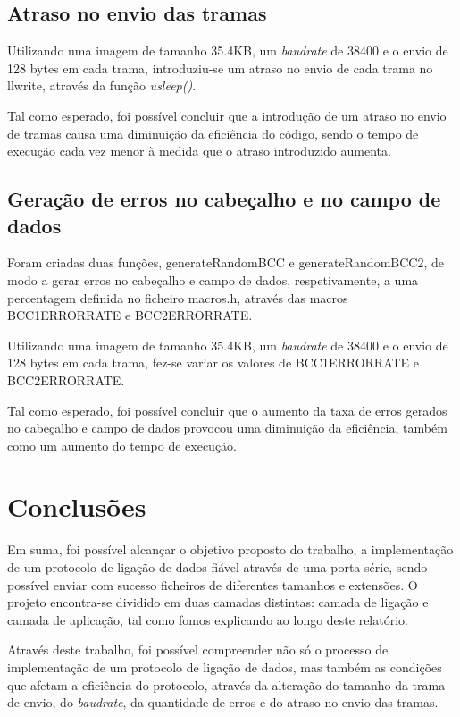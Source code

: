 \documentclass{article}
\begin{document}
\subsection{Atraso no envio das tramas}

Utilizando uma imagem de tamanho 35.4KB, um \textit{baudrate} de 38400 e o envio de 128 bytes em cada trama, introduziu-se um atraso no envio de cada trama no llwrite, através da função \textit{usleep()}.

Tal como esperado, foi possível concluir que a introdução de um atraso no envio de tramas causa uma diminuição da eficiência do código, sendo o tempo de execução cada vez menor à medida que o atraso introduzido aumenta.

\subsection{Geração de erros no cabeçalho e no campo de dados}

Foram criadas duas funções, generateRandomBCC e generateRandomBCC2, de modo a gerar erros no cabeçalho e campo de dados, respetivamente, a uma percentagem definida no ficheiro macros.h, através das macros BCC1ERRORRATE e BCC2ERRORRATE.

Utilizando uma imagem de tamanho 35.4KB, um \textit{baudrate} de 38400 e o envio de 128 bytes em cada trama, fez-se variar os valores de BCC1ERRORRATE e BCC2ERRORRATE.

Tal como esperado, foi possível concluir que o aumento da taxa de erros gerados no cabeçalho e campo de dados provocou uma diminuição da eficiência, também como um aumento do tempo de execução.

\section{Conclusões}

Em suma, foi possível alcançar o objetivo proposto do trabalho, a implementação de um protocolo de ligação de dados fiável através de uma porta série, sendo possível enviar com sucesso ficheiros de diferentes tamanhos e extensões. O projeto encontra-se dividido em duas camadas distintas: camada de ligação e camada de aplicação, tal como fomos explicando ao longo deste relatório.

Através deste trabalho, foi possível compreender não só o processo de implementação de um protocolo de ligação de dados, mas também as condições que afetam a eficiência do protocolo, através da alteração do tamanho da trama de envio, do \textit{baudrate}, da quantidade de erros e do atraso no envio das tramas.
\end{document}

